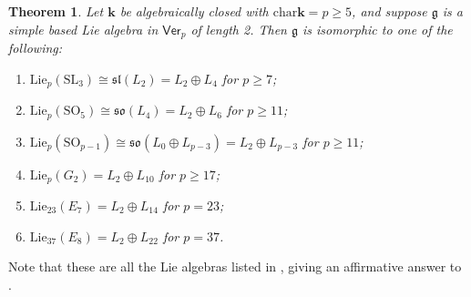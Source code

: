 \documentclass[11pt,a4paper,reqno]{amsart}
\newtheorem{theorem}[subsection]{Theorem}
\theoremstyle{definition}
\newcommand{\bk}{\mathbf{k}}
\numberwithin{equation}{section}
\newcommand{\charr}{\mathrm{char}}
\newcommand{\Ver}{\mathsf{Ver}}
\newcommand{\fg}{\mathfrak{g}}
\newcommand{\fsl}{\mathfrak{sl}}
\newcommand{\fso}{\mathfrak{so}}
\newcommand{\Lie}{\mathrm{Lie}}
\newcommand{\SL}{\mathrm{SL}}
\newcommand{\SO}{\mathrm{SO}}
\begin{document}
\begin{theorem}\label{ThmLength2}
Let $\bk$ be algebraically closed with $\charr\bk=p\geq5$, and suppose $\fg$ is a simple based Lie algebra in $\Ver_p$ of length 2. Then $\fg$ is isomorphic to one of the following:
\begin{enumerate}
\item\label{Item2A} $\Lie_p(\SL_3)\cong\fsl(L_2)=L_2\oplus L_4$ for $p\geq7$;
\item\label{Item2B} $\Lie_p(\SO_5)\cong\fso(L_4)=L_2\oplus L_6$ for $p\geq11$;
\item\label{Item2D} $\Lie_p(\SO_{p-1})\cong\fso(L_0\oplus L_{p-3})=L_2\oplus L_{p-3}$ for $p\geq11$;
\item\label{Item2G} $\Lie_p(G_2)=L_2\oplus L_{10}$ for $p\geq17$;
\item\label{Item2E7} $\Lie_{23}(E_7)=L_2\oplus L_{14}$ for $p=23$;
\item\label{Item2E8} $\Lie_{37}(E_8)=L_2\oplus L_{22}$ for $p=37$.
\end{enumerate}
\end{theorem}

Note that these are all the Lie algebras listed in \cite[\S4.3]{asymptotic}, giving an affirmative answer to \cite[Conjecture~4.4]{asymptotic}.
\end{document}
